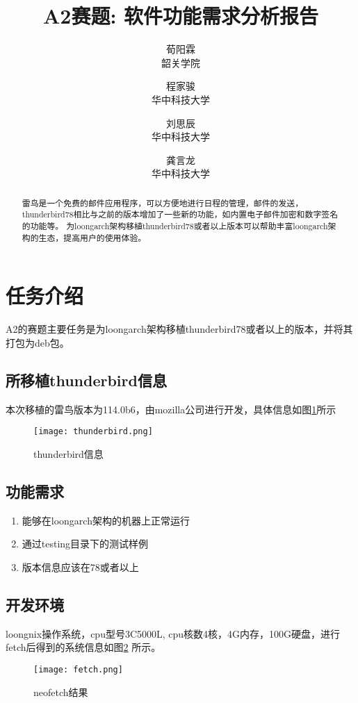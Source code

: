 \documentclass[lang=cn,a4paper,newtx]{elegantpaper}
\title{A2赛题: 软件功能需求分析报告}
\author{荀阳霖	\\ 韶关学院 \and 程家骏 \\ 华中科技大学 \and 刘思辰\\ 华中科技大学 \and 龚言龙 \\ 华中科技大学}
\institute{\href{https://elegantlatex.org/}{porter项目组}}
\date{\zhdate{2023/7/5}}
\begin{document}
\maketitle

\begin{abstract}
    雷鸟是一个免费的邮件应用程序，可以方便地进行日程的管理，邮件的发送，thunderbird78相比与之前的版本增加了一些新的功能，如内置电子邮件加密和数字签名的功能等。
为loongarch架构移植thunderbird78或者以上版本可以帮助丰富loongarch架构的生态，提高用户的使用体验。
\end{abstract}

\section{任务介绍}

A2的赛题主要任务是为loongarch架构移植thunderbird78或者以上的版本，并将其打包为deb包。
\subsection{所移植thunderbird信息}

本次移植的雷鸟版本为114.0b6，由mozilla公司进行开发，具体信息如图\ref{thunderbird}所示
\begin{figure}[!htb]
    \centering
    \texttt{[image: thunderbird.png]}
    \caption{thunderbird信息}
    \label{thunderbird}
\end{figure}

\subsection{功能需求}
\begin{enumerate}
    \item 能够在loongarch架构的机器上正常运行
    \item 通过testing目录下的测试样例
    \item 版本信息应该在78或者以上
\end{enumerate}
\subsection{开发环境}

loongnix操作系统，cpu型号3C5000L, cpu核数4核，4G内存，100G硬盘，进行fetch后得到的系统信息如图\ref{neofetch} 所示。

\begin{figure}[!htb]
    \centering
    \texttt{[image: fetch.png]}
    \caption{neofetch结果}
    \label{neofetch}
\end{figure}
\end{document}
